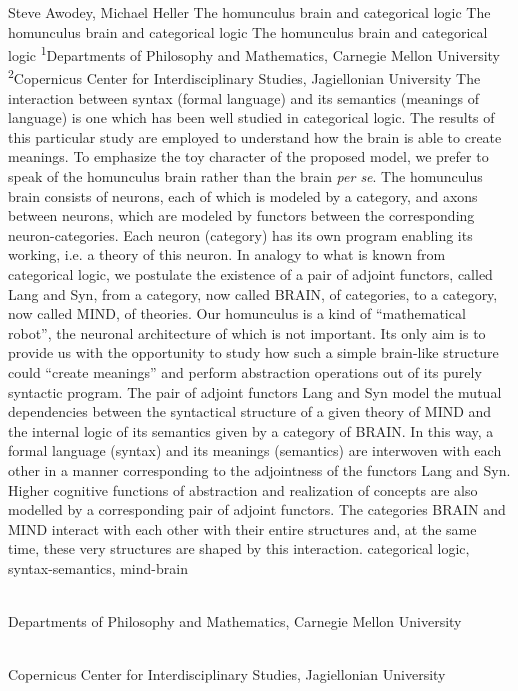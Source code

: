 \begin{artengenv2auth}{Steve Awodey, Michael Heller}
	{The homunculus brain and categorical logic}
	{The homunculus brain and categorical logic}
	{The homunculus brain and categorical logic}
	{\textsuperscript{1}Departments of Philosophy and Mathematics, Carnegie Mellon University\\
		\textsuperscript{2}Copernicus Center for Interdisciplinary Studies, Jagiellonian University}
	{The interaction between syntax (formal language) and its semantics (meanings of language) is one which has been well studied in categorical logic. The results of this particular study are employed to understand how the brain is able to create meanings. To emphasize the toy character of the proposed model, we prefer to speak of the homunculus brain rather than the brain \textit{per se}. The homunculus brain consists of neurons, each of which is modeled by a category, and axons between neurons, which are modeled by functors between the corresponding neuron-categories. Each neuron (category) has its own program enabling its working, i.e. a theory of this neuron. In analogy to what is known from categorical logic, we postulate the existence of a pair of adjoint functors, called Lang and Syn, from a category, now called BRAIN, of categories, to a category, now called MIND, of theories. Our homunculus is a kind of ``mathematical robot'', the neuronal architecture of which is not important. Its only aim is to provide us with the opportunity to study how such a simple brain-like structure could ``create meanings'' and perform abstraction operations out of its purely syntactic program. The pair of adjoint functors Lang and Syn model the mutual dependencies between the syntactical structure of a given theory of MIND and the internal logic of its semantics given by a category of BRAIN. In this way, a formal language (syntax) and its meanings (semantics) are interwoven with each other in a manner corresponding to the adjointness of the functors Lang and Syn.  Higher cognitive functions of abstraction and realization of concepts are also modelled by a corresponding pair of adjoint functors.  The categories BRAIN and MIND interact with each other with their entire structures and, at the same time, these very structures are shaped by this interaction.}
	{categorical logic, syntax-semantics, mind-brain}
	{%
		{\flushright{}\\\subsubsectit\small{Departments of Philosophy and Mathematics, Carnegie Mellon University}\par}%
		{\flushright{}\\\subsubsectit\small{Copernicus Center for Interdisciplinary Studies, Jagiellonian University}\par}%
	}
	

\end{artengenv2auth}
